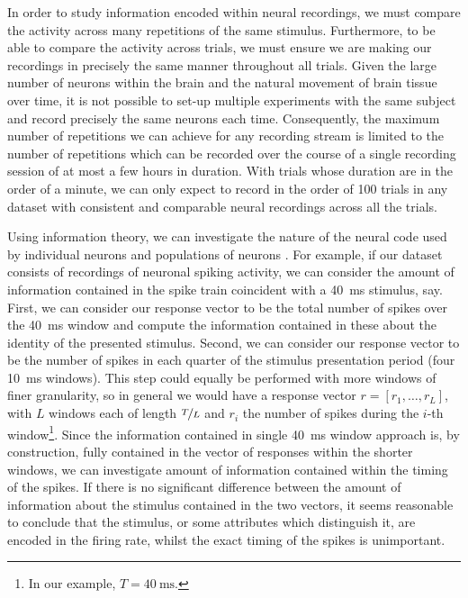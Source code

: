 In order to study information encoded within neural recordings, we must compare the activity across many repetitions of the same stimulus.
Furthermore, to be able to compare the activity across trials, we must ensure we are making our recordings in precisely the same manner throughout all trials.
Given the large number of neurons within the brain and the natural movement of brain tissue over time, it is not possible to set-up multiple experiments with the same subject and record precisely the same neurons each time.
Consequently, the maximum number of repetitions we can achieve for any recording stream is limited to the number of repetitions which can be recorded over the course of a single recording session of at most a few hours in duration.
With trials whose duration are in the order of a minute, we can only expect to record in the order of 100 trials in any dataset with consistent and comparable neural recordings across all the trials.

Using information theory, we can investigate the nature of the neural code used by individual neurons and populations of neurons \citep{Optican1987}.
For example, if our dataset consists of recordings of neuronal spiking activity, we can consider the amount of information contained in the spike train coincident with a \SI{40}{\milli\second} stimulus, say.
First, we can consider our response vector to be the total number of spikes over the \SI{40}{\milli\second} window and compute the information contained in these about the identity of the presented stimulus.
Second, we can consider our response vector to be the number of spikes in each quarter of the stimulus presentation period (four \SI{10}{\milli\second} windows).
This step could equally be performed with more windows of finer granularity, so in general we would have a response vector $r = [r_1, \ldots, r_L]$, with $L$ windows each of length $\nicefrac{T}{L}$ and $r_i$ the number of spikes during the $i$-th window\footnote{In our example, $T = \SI{40}{\milli\second}$.}.
Since the information contained in single \SI{40}{\milli\second} window approach is, by construction, fully contained in the vector of responses within the shorter windows, we can investigate amount of information contained within the timing of the spikes.
If there is no significant difference between the amount of information about the stimulus contained in the two vectors, it seems reasonable to conclude that the stimulus, or some attributes which distinguish it, are encoded in the firing rate, whilst the exact timing of the spikes is unimportant.

